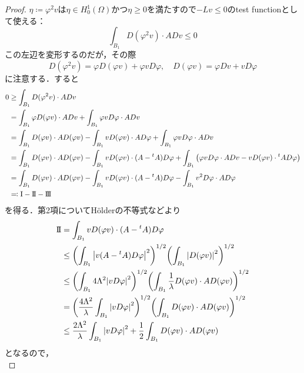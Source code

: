\documentclass[a4paper]{ltjsarticle}
\newcommand{\transpose}[1]{\prescript{t}{}{#1}}
\newcommand{\Om}{\Omega}
\newcommand{\one}{\mathrm{I}}
\newcommand{\two}{\mathrm{I}\hspace{-1.2pt}\mathrm{I}}
\newcommand{\three}{\mathrm{I}\hspace{-1.2pt}\mathrm{I}\hspace{-1.2pt}\mathrm{I}}
\newcommand{\1}{\mathbbm{1}}
\numberwithin{equation}{section}
\theoremstyle{definition}
\begin{document}
\begin{proof}
    $\eta\coloneqq \varphi^2v$は$\eta\in H^1_0(\Om)$かつ$\eta\geq0$を満たすので$-Lv\leq0$のtest functionとして使える：
    \begin{equation}
        \int_{B_1}D(\varphi^2v)\cdot ADv\leq0
    \end{equation}
    この左辺を変形するのだが，その際
    \begin{equation}
        D(\varphi^2 v)=\varphi D(\varphi v)+\varphi vD\varphi,\quad D(\varphi v)=\varphi Dv+v D\varphi
    \end{equation}
    に注意する．すると
    \begin{align}
        0&\geq \int_{B_1}D(\varphi^2v)\cdot ADv\\
        &=\int_{B_1}\varphi D(\varphi v)\cdot ADv+\int_{B_1}\varphi v D\varphi\cdot ADv\\
        &=\int_{B_1}D(\varphi v)\cdot AD(\varphi v)-\int_{B_1}v D(\varphi v)\cdot AD\varphi +\int_{B_1}\varphi v D\varphi \cdot ADv\\
        &=\int_{B_1}D(\varphi v)\cdot AD(\varphi v)-\int_{B_1}vD(\varphi v)\cdot (A-\transpose{A})D\varphi+\int_{B_1}\qty(\varphi v D\varphi \cdot ADv-vD(\varphi v)\cdot \transpose{A}D\varphi)\\
        &=\int_{B_1}D(\varphi v)\cdot AD(\varphi v)-\int_{B_1}vD(\varphi v)\cdot (A-\transpose{A})D\varphi-\int_{B_1}v^2D\varphi\cdot AD\varphi\\
        &\eqqcolon \one-\two-\three
    \end{align}
    を得る．第2項についてHölderの不等式などより
    \begin{align}
        \two&=\int_{B_1}vD(\varphi v)\cdot (A-\transpose{A})D\varphi\\
        &\leq \qty(\int_{B_1}\abs{v(A-\transpose{A})D\varphi}^2)^{1/2}\qty(\int_{B_1}\abs{D(\varphi v)}^2)^{1/2}\\
        &\leq \qty(\int_{B_1}4\Lambda^2\abs{vD\varphi}^2)^{1/2}\qty(\int_{B_1}\frac{1}{\lambda}D(\varphi v)\cdot AD(\varphi v))^{1/2}\\
        &=\qty(\frac{4\Lambda^2}{\lambda}\int_{B_1}\abs{vD\varphi}^2)^{1/2}\qty(\int_{B_1}D(\varphi v)\cdot AD(\varphi v))^{1/2}\\
        &\leq \frac{2\Lambda^2}{\lambda}\int_{B_1}\abs{vD\varphi}^2+\frac{1}{2}\int_{B_1}D(\varphi v)\cdot AD(\varphi v)\\
    \end{align}
    となるので，
    \begin{equation}

\end{equation}
\end{proof}
\end{document}
